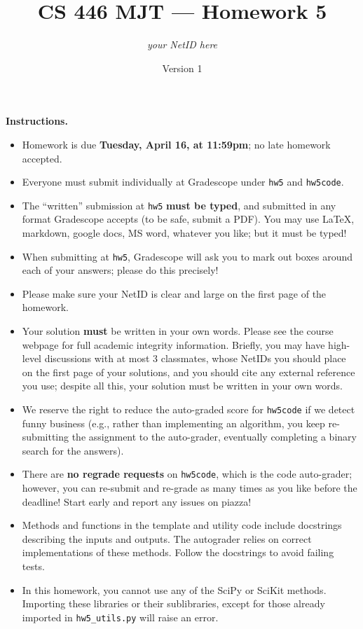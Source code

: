 \documentclass{article}
\title{CS 446 MJT --- Homework 5}
\author{\emph{your NetID here}}
\date{Version 1}
\theoremstyle{definition}
\theoremstyle{remark}
\begin{document}
\maketitle

\textbf{Instructions.}
\begin{itemize}
    \item
    Homework is due \textbf{Tuesday, April 16, at 11:59pm}; no late homework accepted.

    \item
    Everyone must submit individually at Gradescope under \texttt{hw5} and \texttt{hw5code}.

    \item
    The ``written'' submission at \texttt{hw5} \textbf{must be typed}, and submitted in
    any format Gradescope accepts (to be safe, submit a PDF).  You may use \LaTeX, markdown,
    google docs, MS word, whatever you like; but it must be typed!

    \item
    When submitting at \texttt{hw5}, Gradescope will ask you to mark out boxes
    around each of your answers; please do this precisely!

    \item
    Please make sure your NetID is clear and large on the first page of the homework.

    \item
    Your solution \textbf{must} be written in your own words.
    Please see the course webpage for full academic integrity information.
    Briefly, you may have high-level discussions with at most 3 classmates,
    whose NetIDs you should place on the first page of your solutions,
    and you should cite any external reference you use; despite all this,
    your solution must be written in your own words.

    \item
    We reserve the right to reduce the auto-graded score for \texttt{hw5code}
    if we detect funny business (e.g., rather than implementing an algorithm,
    you keep re-submitting the assignment to the auto-grader, eventually completing
    a binary search for the answers).

    \item
    There are \textbf{no regrade requests} on \texttt{hw5code}, which is the code auto-grader;
    however, you can re-submit and re-grade as many times as you like before the deadline!
    Start early and report any issues on piazza!

    \item
    Methods and functions in the template and utility code include
    docstrings describing the inputs and outputs.  The autograder
    relies on correct implementations of these methods.  Follow the
    docstrings to avoid failing tests.

    \item
    In this homework, you cannot use any of the SciPy or SciKit methods. Importing these libraries or their sublibraries, except for those already imported in \texttt{hw5\_utils.py} will raise an error.

\end{itemize}
\end{document}
